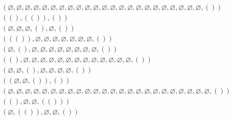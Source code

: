 \documentclass[12pt]{article}
\def\qua{()}
\newcommand{\quat}[1]{\left( #1 \right)}
\def\nul{\varnothing}
\begin{document}
\begin{align*}
&\quat{\nul,\nul,\nul,\nul,\nul,\nul,\nul,\nul,\nul,\nul,\nul,\nul,\nul,\nul,\nul,\nul,\nul,\nul,\nul,\nul,\nul,\nul,\nul,\qua}\\
&\quat{\qua,\quat{\qua},\qua}\\
&\quat{\nul,\nul,\nul,\qua,\nul,\qua}\\
&\quat{\quat{\qua},\nul,\nul,\nul,\nul,\nul,\nul,\nul,\qua}\\
&\quat{\nul,\qua,\nul,\nul,\nul,\nul,\nul,\nul,\nul,\nul,\qua}\\
&\quat{\qua,\nul,\nul,\nul,\nul,\nul,\nul,\nul,\nul,\nul,\nul,\nul,\nul,\nul,\qua}\\
&\quat{\nul,\nul,\qua,\nul,\nul,\nul,\nul,\qua}\\
&\quat{\quat{\nul,\nul,\qua},\qua}\\
&\quat{\nul,\nul,\nul,\nul,\nul,\nul,\nul,\nul,\nul,\nul,\nul,\nul,\nul,\nul,\nul,\nul,\nul,\nul,\nul,\nul,\nul,\nul,\nul,\nul,\qua}\\
&\quat{\qua,\nul,\nul,\quat{\qua}}\\
&\quat{\nul,\quat{\qua},\nul,\nul,\qua}\\
\end{align*}
\end{document}
